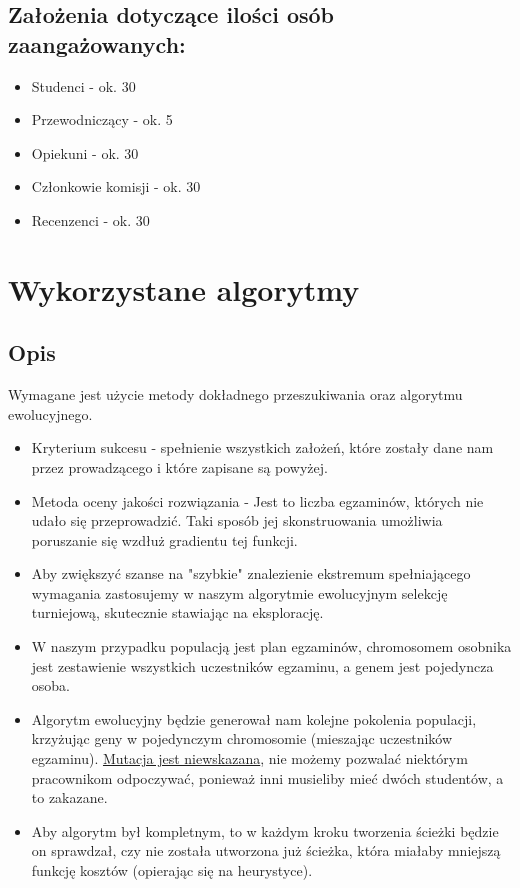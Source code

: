 \documentclass{article}
\begin{document}
\subsection{Założenia dotyczące ilości osób zaangażowanych:}
\begin{itemize}
    \item Studenci - ok. 30
    \item Przewodniczący - ok. 5
    \item Opiekuni - ok. 30
    \item Członkowie komisji - ok. 30
    \item Recenzenci - ok. 30
\end{itemize}
\section{Wykorzystane algorytmy}
\subsection{Opis}
Wymagane jest użycie metody dokładnego przeszukiwania oraz algorytmu ewolucyjnego.
\begin{itemize}
    \item Kryterium sukcesu - spełnienie wszystkich założeń, które zostały dane nam przez prowadzącego i które zapisane są powyżej.
    \item Metoda oceny jakości rozwiązania - Jest to liczba egzaminów, których nie udało się przeprowadzić. Taki sposób jej skonstruowania umożliwia poruszanie się wzdłuż gradientu tej funkcji. 
    \item Aby zwiększyć szanse na "szybkie" znalezienie ekstremum spełniającego wymagania zastosujemy w naszym algorytmie ewolucyjnym selekcję turniejową, skutecznie stawiając na eksplorację. 
    \item W naszym przypadku populacją jest plan egzaminów, chromosomem osobnika jest zestawienie wszystkich uczestników egzaminu, a genem jest pojedyncza osoba.
    \item Algorytm ewolucyjny będzie generował nam kolejne pokolenia populacji, krzyżując geny w pojedynczym chromosomie (mieszając uczestników egzaminu). \underline{Mutacja jest niewskazana}, nie możemy pozwalać niektórym pracownikom odpoczywać, ponieważ inni musieliby mieć dwóch studentów, a to zakazane.
    \item Aby algorytm był kompletnym, to w każdym kroku tworzenia ścieżki będzie on sprawdzał, czy nie została utworzona już ścieżka, która miałaby  mniejszą funkcję kosztów (opierając się na heurystyce).
\end{itemize}
\end{document}
